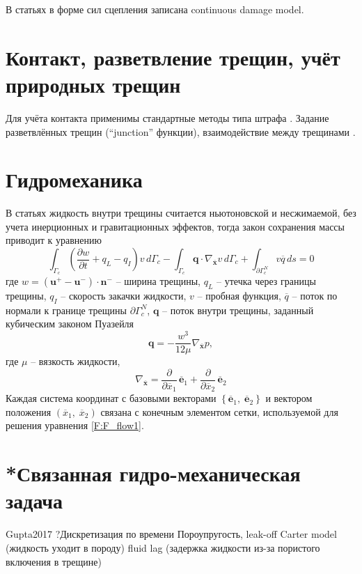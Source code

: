 В статьях \cite{Roth2020_1, Roth2020_2} в форме сил сцепления записана continuous damage model.

\section{Контакт, разветвление трещин, учёт природных трещин}
Для учёта контакта применимы стандартные методы типа штрафа \cite{GuptaDiss2016}.
Задание разветвлённых трещин (“junction” функции), взаимодействие между трещинами \cite{Moes2013,Moes2016,Moes2017,Paul2018}.
\section{Гидромеханика}
В статьях \cite{Gupta2015,Gupta2017,Duarte2019,Duarte2020} жидкость внутри трещины считается ньютоновской и несжимаемой, без учета инерционных и гравитационных эффектов, тогда закон сохранения массы приводит к уравнению
\begin{equation}
\int_{\Gamma_c}\left(\frac{\partial w}{\partial t}+q_L-q_I\right)v\,d\Gamma_c
-\int_{\Gamma_c}\mathbf{q}\cdot\nabla_{\overline{\mathbf{x}}}v\,d\Gamma_c
+\int_{\partial\Gamma_c^N}v\overline{q}\,ds=0
\label{F:F_flow1}
\end{equation}
где $w=\left(\mathbf{u}^+-\mathbf{u}^-\right)\cdot \mathbf{n}^-$ -- ширина трещины, $q_L$ -- утечка через границы трещины, $q_I$ -- скорость закачки жидкости, $v$ -- пробная функция, $\overline{q}$ -- поток по нормали к границе трещины $\partial\Gamma_c^N$, $\mathbf{q}$ -- поток внутри трещины, заданный кубическим законом Пуазейля
\begin{equation}
\mathbf{q} = -\frac{w^3}{12\mu}\nabla_{\overline{\mathbf{x}}}p,
\label{F:F_flow2}
\end{equation}
где $\mu$ -- вязкость жидкости,
\begin{equation}
\nabla_{\overline{\mathbf{x}}}=
 \frac{\partial}{\partial\overline{x}_1}\,\overline{\mathbf{e}}_1
+\frac{\partial}{\partial\overline{x}_2}\,\overline{\mathbf{e}}_2
\label{F:F_flow3}
\end{equation}
Каждая система координат с базовыми векторами $\left\lbrace \overline{\mathbf{e}}_1,\;\overline{\mathbf{e}}_2\right\rbrace $ и вектором положения $\left( \overline{x}_1,\;\overline{x}_2\right) $ связана с конечным элементом сетки, используемой для решения уравнения \eqref{F:F_flow1}.

\section{*Связанная гидро-механическая задача}
Gupta2017
?Дискретизация по времени
Пороупругость, leak-off Carter model (жидкость уходит в породу)
fluid lag (задержка жидкости из-за пористого включения в трещине)

